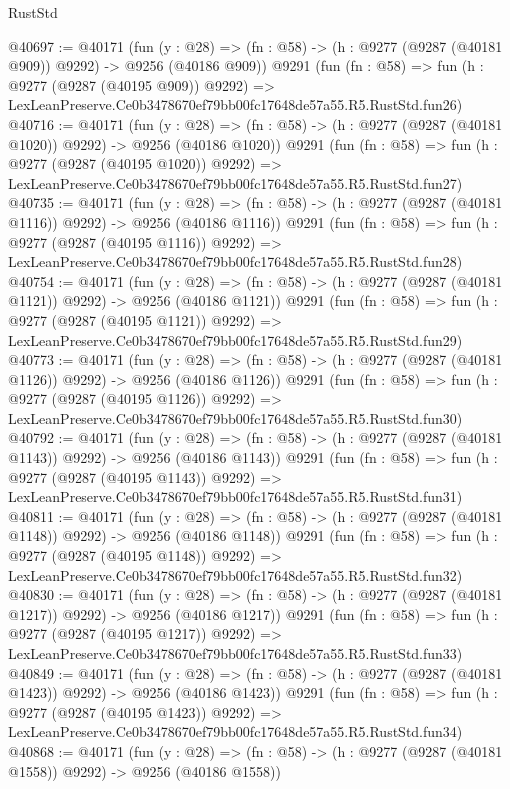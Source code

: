 \begin{lexlean}{RustStd}
\begin{coremodule}
@40697 := @40171
    (fun (y : @28) => (fn : @58) -> (h : @9277 (@9287 (@40181 @909)) @9292) -> @9256 (@40186 @909))
    @9291
    (fun (fn : @58) =>
    fun (h : @9277 (@9287 (@40195 @909)) @9292) =>
    LexLeanPreserve.Ce0b3478670ef79bb00fc17648de57a55.R5.RustStd.fun26)
@40716 := @40171
    (fun (y : @28) =>
    (fn : @58) -> (h : @9277 (@9287 (@40181 @1020)) @9292) -> @9256 (@40186 @1020))
    @9291
    (fun (fn : @58) =>
    fun (h : @9277 (@9287 (@40195 @1020)) @9292) =>
    LexLeanPreserve.Ce0b3478670ef79bb00fc17648de57a55.R5.RustStd.fun27)
@40735 := @40171
    (fun (y : @28) =>
    (fn : @58) -> (h : @9277 (@9287 (@40181 @1116)) @9292) -> @9256 (@40186 @1116))
    @9291
    (fun (fn : @58) =>
    fun (h : @9277 (@9287 (@40195 @1116)) @9292) =>
    LexLeanPreserve.Ce0b3478670ef79bb00fc17648de57a55.R5.RustStd.fun28)
@40754 := @40171
    (fun (y : @28) =>
    (fn : @58) -> (h : @9277 (@9287 (@40181 @1121)) @9292) -> @9256 (@40186 @1121))
    @9291
    (fun (fn : @58) =>
    fun (h : @9277 (@9287 (@40195 @1121)) @9292) =>
    LexLeanPreserve.Ce0b3478670ef79bb00fc17648de57a55.R5.RustStd.fun29)
@40773 := @40171
    (fun (y : @28) =>
    (fn : @58) -> (h : @9277 (@9287 (@40181 @1126)) @9292) -> @9256 (@40186 @1126))
    @9291
    (fun (fn : @58) =>
    fun (h : @9277 (@9287 (@40195 @1126)) @9292) =>
    LexLeanPreserve.Ce0b3478670ef79bb00fc17648de57a55.R5.RustStd.fun30)
@40792 := @40171
    (fun (y : @28) =>
    (fn : @58) -> (h : @9277 (@9287 (@40181 @1143)) @9292) -> @9256 (@40186 @1143))
    @9291
    (fun (fn : @58) =>
    fun (h : @9277 (@9287 (@40195 @1143)) @9292) =>
    LexLeanPreserve.Ce0b3478670ef79bb00fc17648de57a55.R5.RustStd.fun31)
@40811 := @40171
    (fun (y : @28) =>
    (fn : @58) -> (h : @9277 (@9287 (@40181 @1148)) @9292) -> @9256 (@40186 @1148))
    @9291
    (fun (fn : @58) =>
    fun (h : @9277 (@9287 (@40195 @1148)) @9292) =>
    LexLeanPreserve.Ce0b3478670ef79bb00fc17648de57a55.R5.RustStd.fun32)
@40830 := @40171
    (fun (y : @28) =>
    (fn : @58) -> (h : @9277 (@9287 (@40181 @1217)) @9292) -> @9256 (@40186 @1217))
    @9291
    (fun (fn : @58) =>
    fun (h : @9277 (@9287 (@40195 @1217)) @9292) =>
    LexLeanPreserve.Ce0b3478670ef79bb00fc17648de57a55.R5.RustStd.fun33)
@40849 := @40171
    (fun (y : @28) =>
    (fn : @58) -> (h : @9277 (@9287 (@40181 @1423)) @9292) -> @9256 (@40186 @1423))
    @9291
    (fun (fn : @58) =>
    fun (h : @9277 (@9287 (@40195 @1423)) @9292) =>
    LexLeanPreserve.Ce0b3478670ef79bb00fc17648de57a55.R5.RustStd.fun34)
@40868 := @40171
    (fun (y : @28) =>
    (fn : @58) -> (h : @9277 (@9287 (@40181 @1558)) @9292) -> @9256 (@40186 @1558))

\end{coremodule}
\end{lexlean}
